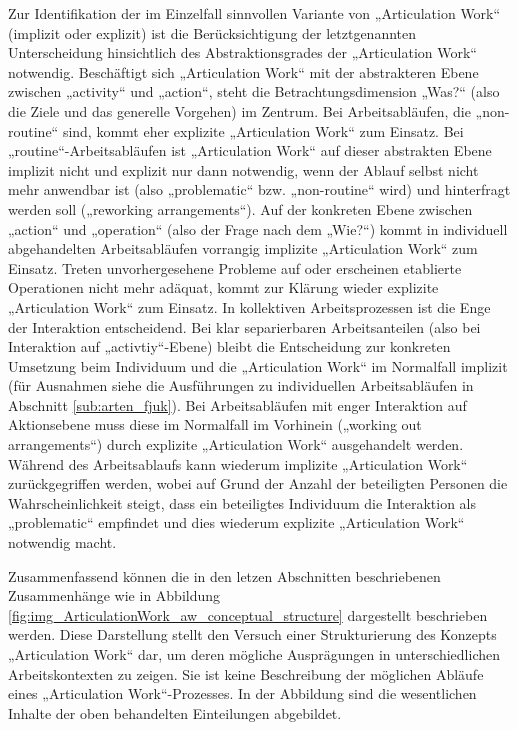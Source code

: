Zur Identifikation der im Einzelfall sinnvollen Variante von „Articulation Work“ (implizit oder explizit) ist die Berücksichtigung der letztgenannten Unterscheidung hinsichtlich des Abstraktionsgrades der „Articulation Work“ notwendig. Beschäftigt sich „Articulation Work“ mit der abstrakteren Ebene zwischen „activity“ und „action“, steht die Betrachtungsdimension „Was?“ (also die Ziele und das generelle Vorgehen) im Zentrum. Bei Arbeitsabläufen, die „non-routine“ sind, kommt eher explizite „Articulation Work“ zum Einsatz. Bei „routine“-Arbeitsabläufen ist „Articulation Work“ auf dieser abstrakten Ebene implizit nicht und explizit nur dann notwendig, wenn der Ablauf selbst nicht mehr anwendbar ist (also „problematic“ bzw. „non-routine“ wird) und hinterfragt werden soll („reworking arrangements“). Auf der konkreten Ebene zwischen „action“ und „operation“ (also der Frage nach dem „Wie?“) kommt in individuell abgehandelten Arbeitsabläufen vorrangig implizite „Articulation Work“ zum Einsatz. Treten unvorhergesehene Probleme auf oder erscheinen etablierte Operationen nicht mehr adäquat, kommt zur Klärung wieder explizite „Articulation Work“ zum Einsatz. In kollektiven Arbeitsprozessen ist die Enge der Interaktion entscheidend. Bei klar separierbaren Arbeitsanteilen (also bei Interaktion auf „activtiy“-Ebene) bleibt die Entscheidung zur konkreten Umsetzung beim Individuum und die „Articulation Work“ im Normalfall implizit (für Ausnahmen siehe die Ausführungen zu individuellen Arbeitsabläufen in Abschnitt \ref{sub:arten_fjuk}). Bei Arbeitsabläufen mit enger Interaktion auf Aktionsebene muss diese im Normalfall im Vorhinein („working out arrangements“) durch explizite „Articulation Work“ ausgehandelt werden. Während des Arbeitsablaufs kann wiederum implizite „Articulation Work“ zurückgegriffen werden, wobei auf Grund der Anzahl der beteiligten Personen die Wahrscheinlichkeit steigt, dass ein beteiligtes Individuum die Interaktion als „problematic“ empfindet und dies wiederum explizite „Articulation Work“ notwendig macht.

Zusammenfassend können die in den letzen Abschnitten beschriebenen Zusammenhänge wie in Abbildung \ref{fig:img_ArticulationWork_aw_conceptual_structure} dargestellt beschrieben werden. Diese Darstellung stellt den Versuch einer Strukturierung des Konzepts „Articulation Work“ dar, um deren mögliche Ausprägungen in unterschiedlichen Arbeitskontexten zu zeigen. Sie ist keine Beschreibung der möglichen Abläufe eines „Articulation Work“-Prozesses. In der Abbildung sind die wesentlichen Inhalte der oben behandelten Einteilungen abgebildet.

